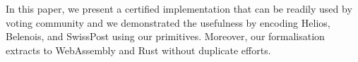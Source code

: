 \documentclass[conference,compsoc]{IEEEtran}
\begin{document}
 

  In this paper, we present a certified implementation 
  that can be readily used by voting community and 
  we demonstrated the usefulness by encoding Helios, 
  Belenois, and SwissPost using our primitives. 
  Moreover, our formalisation extracts to WebAssembly and 
  Rust without duplicate efforts. 











\end{document}
